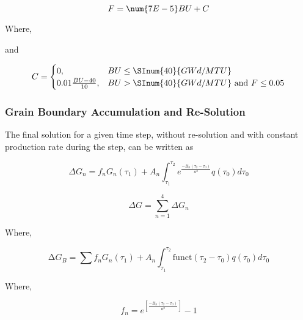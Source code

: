 \begin{equation}
    \label{eq:forsberg_massih_low_temp_fgr}
    F = \num{7E- 5}BU + C
\end{equation}

Where,

and

$$
    C = \begin{cases}
            0,                     & BU \leq \SInum{40}{GWd/MTU}  \\
            0.01 \frac{BU-40}{10}, & BU>\SInum{40}{GWd/MTU} \text{ and } F\leq 0.05
        \end{cases}
$$

\subsubsection{Grain Boundary Accumulation and Re-Solution}\label{section:grain-boundary-accumulation-and-re-solution}

The final solution for a given time step, without re-solution and with constant production rate
during the step, can be written as

\begin{equation}
    \label{eq:forsberg_massih_delta_G_n}
    \Delta G_{n} = f_{n}G_{n}\left(\tau_{1}\right) + A_{n}\int_{\tau_1}^{\tau_2}e^{\frac{-B_{n}\left(\tau_2-\tau_0\right)}{a^2}}q\left(\tau_{0}\right)d\tau_0
\end{equation}

\begin{equation}
    \label{eq:forsberg_massih_delta_G}
    \Delta G = \sum_{n = 1}^{4} \Delta G_n
\end{equation}

Where,

\begin{equation}
    \label{eq:forsberg_massih_G_b}
    \mathrm{\Delta}G_{B} = \sum_{}^{}{f_{n}G_{n}\left( \tau_{1} \right)} + A_{n}\int_{\tau_{1}}^{\tau_{2}}{\text{funct}\left( \tau_{2} - \tau_{0} \right)q\left( \tau_{0} \right){d\tau_{0}}}
\end{equation}

Where,

\begin{equation}
    \label{eq:forsberg_massih_f_n}
    f_{n} = e^{\left\lbrack \frac{- B_{n}\left( \tau_{2} - \tau_{0} \right)}{a^{2}} \right\rbrack} - 1
\end{equation}

